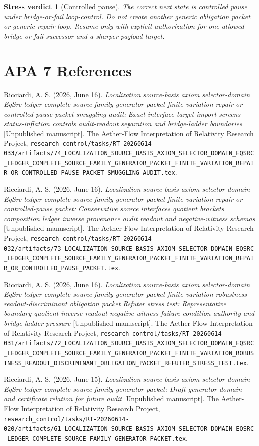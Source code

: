 \documentclass[11pt]{article}
\newtheorem{verdict}{Stress verdict}
\begin{document}
\begin{verdict}[Controlled pause]
The correct next state is controlled pause under bridge-or-fail
loop-control. Do not create another generic obligation packet or
generic repair loop. Resume only with explicit authorization for one
allowed bridge-or-fail successor and a sharper payload target.
\end{verdict}

\section*{APA 7 References}

Ricciardi, A. S. (2026, June 16). \emph{Localization source-basis axiom
selector-domain EqSrc ledger-complete source-family generator packet
finite-variation repair or controlled-pause packet smuggling audit:
Exact-interface target-import screens status-inflation controls
audit-readout separation and bridge-ladder boundaries} [Unpublished
manuscript]. The Aether-Flow Interpretation of Relativity Research
Project,
\texttt{research\_control/tasks/RT-20260614-033/artifacts/74\_LOCALIZATION\_SOURCE\_BASIS\_AXIOM\_SELECTOR\_DOMAIN\_EQSRC\_LEDGER\_COMPLETE\_SOURCE\_FAMILY\_GENERATOR\_PACKET\_FINITE\_VARIATION\_REPAIR\_OR\_CONTROLLED\_PAUSE\_PACKET\_SMUGGLING\_AUDIT.tex}.

Ricciardi, A. S. (2026, June 16). \emph{Localization source-basis axiom
selector-domain EqSrc ledger-complete source-family generator packet
finite-variation repair or controlled-pause packet: Conservative
source interfaces quotient brackets composition ledger inverse
provenance audit readout and negative-witness schemas} [Unpublished
manuscript]. The Aether-Flow Interpretation of Relativity Research
Project,
\texttt{research\_control/tasks/RT-20260614-032/artifacts/73\_LOCALIZATION\_SOURCE\_BASIS\_AXIOM\_SELECTOR\_DOMAIN\_EQSRC\_LEDGER\_COMPLETE\_SOURCE\_FAMILY\_GENERATOR\_PACKET\_FINITE\_VARIATION\_REPAIR\_OR\_CONTROLLED\_PAUSE\_PACKET.tex}.

Ricciardi, A. S. (2026, June 16). \emph{Localization source-basis axiom
selector-domain EqSrc ledger-complete source-family generator packet
finite-variation robustness readout-discriminant obligation packet
Refuter stress test: Representative boundary quotient inverse readout
negative-witness failure-condition authority and bridge-ladder
pressure} [Unpublished manuscript]. The Aether-Flow Interpretation of
Relativity Research Project,
\texttt{research\_control/tasks/RT-20260614-031/artifacts/72\_LOCALIZATION\_SOURCE\_BASIS\_AXIOM\_SELECTOR\_DOMAIN\_EQSRC\_LEDGER\_COMPLETE\_SOURCE\_FAMILY\_GENERATOR\_PACKET\_FINITE\_VARIATION\_ROBUSTNESS\_READOUT\_DISCRIMINANT\_OBLIGATION\_PACKET\_REFUTER\_STRESS\_TEST.tex}.

Ricciardi, A. S. (2026, June 15). \emph{Localization source-basis axiom
selector-domain EqSrc ledger-complete source-family generator packet:
Draft generator domain and certificate relation for future audit}
[Unpublished manuscript]. The Aether-Flow Interpretation of
Relativity Research Project,
\texttt{research\_control/tasks/RT-20260614-020/artifacts/61\_LOCALIZATION\_SOURCE\_BASIS\_AXIOM\_SELECTOR\_DOMAIN\_EQSRC\_LEDGER\_COMPLETE\_SOURCE\_FAMILY\_GENERATOR\_PACKET.tex}.
\end{document}
